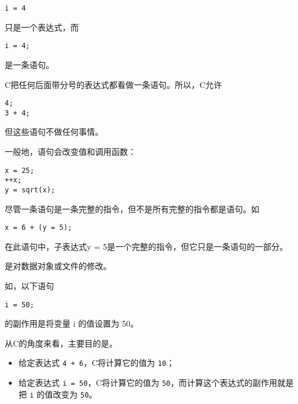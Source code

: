 \begin{frame}[fragile]
\begin{lstlisting}[frame=no]
i = 4
\end{lstlisting}
只是一个表达式，而
\begin{lstlisting}[frame=no]
i = 4;
\end{lstlisting}
是一条语句。

\end{frame}

\begin{frame}[fragile]
C把任何后面带分号的表达式都看做一条语句。所以，C允许
\begin{lstlisting}[frame=no]
4;
3 + 4; 
\end{lstlisting}
但这些语句不做任何事情。
\end{frame}

\begin{frame}[fragile]
一般地，语句会改变值和调用函数：
\begin{lstlisting}[frame=no]
x = 25;
++x;
y = sqrt(x); 
\end{lstlisting}
\end{frame}

\begin{frame}[fragile]
尽管一条语句是一条完整的指令，但不是所有完整的指令都是语句。如
\begin{lstlisting}[frame=no]
x = 6 + (y = 5); 
\end{lstlisting}
在此语句中，子表达式y = 5是一个完整的指令，但它只是一条语句的一部分。
\end{frame}

\begin{frame}[fragile]

\end{frame}


\begin{frame}[fragile]
  是对数据对象或文件的修改。 \vspace{.1in} \pause 

  如，以下语句
  \begin{lstlisting}[frame=no]
i = 50;
  \end{lstlisting}
  的副作用是将变量 i 的值设置为 50。\pause 
{} \pause 
\vspace{0.2in} 


从C的角度来看，主要目的是。\\[0.1in]
\begin{itemize}
\item 给定表达式 \lstinline|4 + 6|，C将计算它的值为 \lstinline|10|；\\[0.1in]
\item 给定表达式 \lstinline|i = 50|，C将计算它的值为 \lstinline|50|，而计算这个表达式的副作用就是把 \lstinline|i| 的值改变为 \lstinline|50|。
\end{itemize}

\end{frame}

